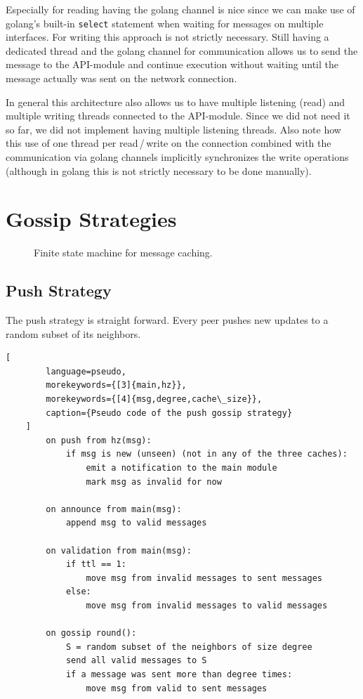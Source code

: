 \documentclass[a4paper,english,10pt,NET]{tumarticle}
\begin{document}
Especially for reading having the golang channel is nice since we can make use of golang's built-in \texttt{select} statement when waiting for messages on multiple interfaces.
For writing this approach is not strictly necessary.
Still having a dedicated thread and the golang channel for communication allows us to send the message to the API-module and continue execution without waiting until the message actually was sent on the network connection.

In general this architecture also allows us to have multiple listening (read) and multiple writing threads connected to the API-module.
Since we did not need it so far, we did not implement having multiple listening threads.
Also note how this use of one thread per read\,/\,write on the connection combined with the communication via golang channels implicitly synchronizes the write operations (although in golang this is not strictly necessary to be done manually).


\section{Gossip Strategies}

\begin{figure}
	\centering
	
	\caption{Finite state machine for message caching.}
	\label{fig:fsm_msgs}
\end{figure}

\subsection{Push Strategy}
The push strategy is straight forward.
Every peer pushes new updates to a random subset of its neighbors.

\begin{minipage}{0.50\linewidth}
	\begin{lstlisting}[
		language=pseudo,
		morekeywords={[3]{main,hz}},
		morekeywords={[4]{msg,degree,cache\_size}},
		caption={Pseudo code of the push gossip strategy}
	]
		on push from hz(msg):
			if msg is new (unseen) (not in any of the three caches):
				emit a notification to the main module
				mark msg as invalid for now

		on announce from main(msg):
			append msg to valid messages

		on validation from main(msg):
			if ttl == 1:
				move msg from invalid messages to sent messages
			else:
				move msg from invalid messages to valid messages

		on gossip round():
			S = random subset of the neighbors of size degree
			send all valid messages to S
			if a message was sent more than degree times:
				move msg from valid to sent messages
	\end{lstlisting}
\end{minipage}
\end{document}
